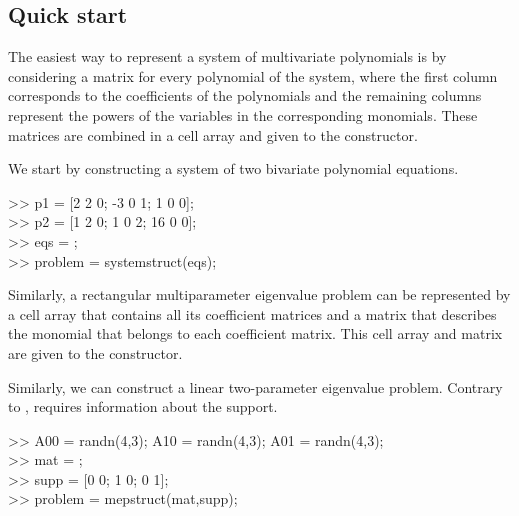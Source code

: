 \documentclass{manual}
\begin{document}
        \subsection{Quick start}
            \label{sec:manual:quickstart}

            The easiest way to represent a system of multivariate polynomials is by considering a matrix for every polynomial of the system, where the first column corresponds to the coefficients of the polynomials and the remaining columns represent the powers of the variables in the corresponding monomials.
            These matrices are combined in a cell array and given to the  constructor.
            \begin{code}
                We start by constructing a system of two bivariate polynomial equations.
                \begin{codeblock}
                    >> p1 = {[2 2 0; -3 0 1; 1 0 0]}; \\
                    >> p2 = {[1 2 0; 1 0 2; 16 0 0]}; \\
                    >> eqs = ; \\
                    >> problem = systemstruct(eqs);
                \end{codeblock}
            \end{code}
            Similarly, a rectangular multiparameter eigenvalue problem can be represented by a cell array that contains all its coefficient matrices and a matrix that describes the monomial that belongs to each coefficient matrix.
            This cell array and matrix are given to the  constructor.
            \begin{code}
                Similarly, we can construct a linear two-parameter eigenvalue problem.
                Contrary to ,  requires information about the support.
                \begin{codeblock}
                    >> A00 = randn(4,3); A10 = randn(4,3); A01 = randn(4,3); \\
                    >> mat = ; \\
                    >> supp = {[0 0; 1 0; 0 1]}; \\
                    >> problem = mepstruct(mat,supp);
                \end{codeblock}
            \end{code}
\end{document}
